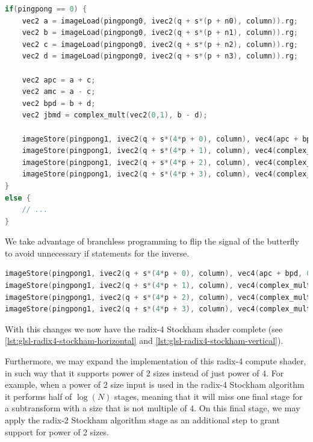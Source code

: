 \documentclass[
  oneside,
  11pt, a4paper,
  footinclude=true,
  headinclude=true,
  cleardoublepage=empty
]{scrbook}
\begin{document}
\begin{lstlisting}[language=C, caption={Radix-4 Stockham butterfly}, label={lst:radix4-stockham-dragonfly}]
if(pingpong == 0) {
    vec2 a = imageLoad(pingpong0, ivec2(q + s*(p + n0), column)).rg;
    vec2 b = imageLoad(pingpong0, ivec2(q + s*(p + n1), column)).rg;
    vec2 c = imageLoad(pingpong0, ivec2(q + s*(p + n2), column)).rg;
    vec2 d = imageLoad(pingpong0, ivec2(q + s*(p + n3), column)).rg;

    vec2 apc = a + c;
    vec2 amc = a - c;
    vec2 bpd = b + d;
    vec2 jbmd = complex_mult(vec2(0,1), b - d);

    imageStore(pingpong1, ivec2(q + s*(4*p + 0), column), vec4(apc + bpd, 0,0));
    imageStore(pingpong1, ivec2(q + s*(4*p + 1), column), vec4(complex_mult(w1p, amc - jbmd), 0,0));
    imageStore(pingpong1, ivec2(q + s*(4*p + 2), column), vec4(complex_mult(w2p, apc - bpd ), 0,0));
    imageStore(pingpong1, ivec2(q + s*(4*p + 3), column), vec4(complex_mult(w3p, amc + jbmd), 0,0));
}
else {
    // ...
}
\end{lstlisting}

We take advantage of branchless programming to flip the signal of the butterfly to avoid unnecessary if statements for the inverse.

\begin{lstlisting}[language=C, caption={Radix-4 Stockham dragonfly inverse arithmetic}, label={lst:radix4-stockham-dragonfly-arithmetic}]
imageStore(pingpong1, ivec2(q + s*(4*p + 0), column), vec4(apc + bpd, 0,0));
imageStore(pingpong1, ivec2(q + s*(4*p + 1), column), vec4(complex_mult(w1p, amc + jbmd*fft_dir), 0,0));
imageStore(pingpong1, ivec2(q + s*(4*p + 2), column), vec4(complex_mult(w2p, apc - bpd ), 0,0));
imageStore(pingpong1, ivec2(q + s*(4*p + 3), column), vec4(complex_mult(w3p, amc - jbmd*fft_dir), 0,0));
\end{lstlisting}


With this changes we now have the radix-4 Stockham shader complete (see \autoref{lst:glsl-radix4-stockham-horizontal} and \autoref{lst:glsl-radix4-stockham-vertical}).
\newline 

Furthermore, we may expand the implementation of this radix-4 compute shader, in such way that it supports power of $2$ sizes instead of just power of $4$. For example, when a power of 2 size input is used in the radix-4 Stockham algorithm it performs half of $\log{(N)}$ stages, meaning that it will miss one final stage for a subtransform with a size that is not multiple of $4$. On this final stage, we may apply the radix-2 Stockham algorithm stage as an additional step to grant support for power of 2 sizes.
\end{document}
